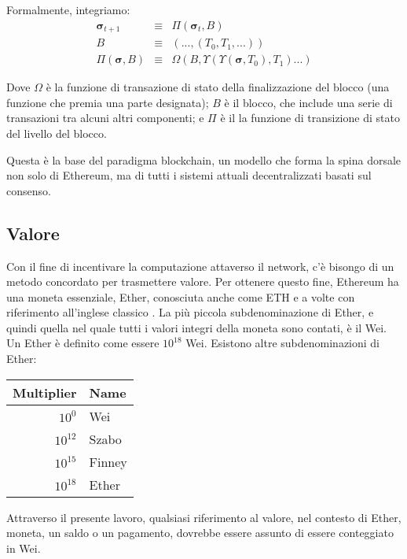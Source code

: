 \documentclass[9pt,oneside]{amsart}
\begin{document}
\begin{multicols}{2}
Formalmente, integriamo:
\begin{eqnarray}
\boldsymbol{\sigma}_{t+1} & \equiv & \Pi(\boldsymbol{\sigma}_t, B) \\
B & \equiv & (..., (T_0, T_1, ...) ) \\
\Pi(\boldsymbol{\sigma}, B) & \equiv & \Omega(B, \Upsilon(\Upsilon(\boldsymbol{\sigma}, T_0), T_1) ...)
\end{eqnarray}

Dove $\Omega$ è la funzione di transazione di stato della finalizzazione del blocco (una funzione che premia una parte designata); $B$ è il blocco, che include una serie di transazioni tra alcuni altri componenti; e $\Pi$ è il la funzione di transizione di stato del livello del blocco.

Questa è la base del paradigma blockchain, un modello che forma la spina dorsale non solo di Ethereum, ma di tutti i sistemi attuali decentralizzati basati sul consenso.

\subsection{Valore}

Con il fine di incentivare la computazione attaverso il network, c'è bisongo di un metodo concordato per trasmettere valore. Per ottenere questo fine, Ethereum ha una moneta essenziale, Ether, conosciuta anche come {\small ETH} e a volte con riferimento all'inglese classico \DH{}. La più piccola subdenominazione di Ether, e quindi quella nel quale tutti i valori integri della moneta sono contati, è il Wei. Un Ether è definito come essere $10^{18}$ Wei. Esistono altre subdenominazioni di Ether:
\par
\begin{center}
\begin{tabular}{rl}
\toprule
Multiplier & Name \\
\midrule
$10^0$ & Wei \\
$10^{12}$ & Szabo \\
$10^{15}$ & Finney \\
$10^{18}$ & Ether \\
\bottomrule
\end{tabular}
\end{center}
\par

Attraverso il presente lavoro, qualsiasi riferimento al valore, nel contesto di Ether, moneta, un saldo o un pagamento, dovrebbe essere assunto di essere conteggiato in Wei.


\end{multicols}
\end{document}
